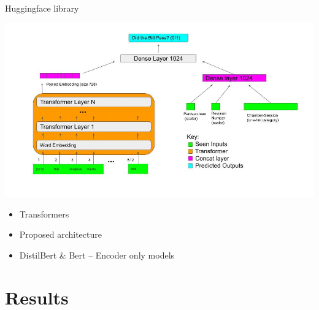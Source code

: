 \documentclass[11pt]{article}
\begin{document}



Huggingface library \cite{huggingface}

\includegraphics[width=150mm]{figures/network_architecture.jpg}


\begin{itemize}
  \item Transformers
  \item Proposed architecture
  \item DistilBert & Bert  -- Encoder only models
\end{itemize}



\section{Results}
\end{document}
